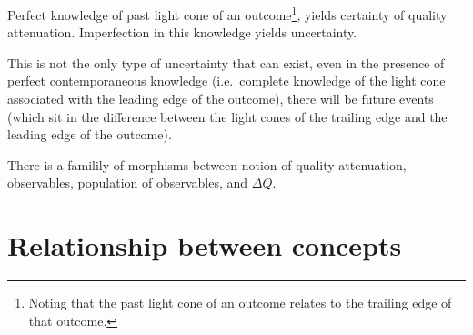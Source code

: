 \documentclass[11pt,a4paper]{article}
\begin{document}
Perfect knowledge of past light cone of an outcome\footnote{Noting that the past light cone 
of an outcome relates to the trailing edge of that outcome.}, yields certainty of 
quality attenuation. Imperfection in this knowledge yields uncertainty.

This is not the only type of uncertainty that can exist, even in the 
presence of perfect contemporaneous knowledge (i.e.\ complete knowledge
of the light cone associated with the leading edge of the outcome), there
will be future events (which sit in the difference between the light
cones of the trailing edge and the leading edge of the outcome). 


There is a familily of morphisms between notion of quality attenuation, 
observables, population of observables,  and $\Delta{Q}$.

\section{Relationship between concepts}
\end{document}

